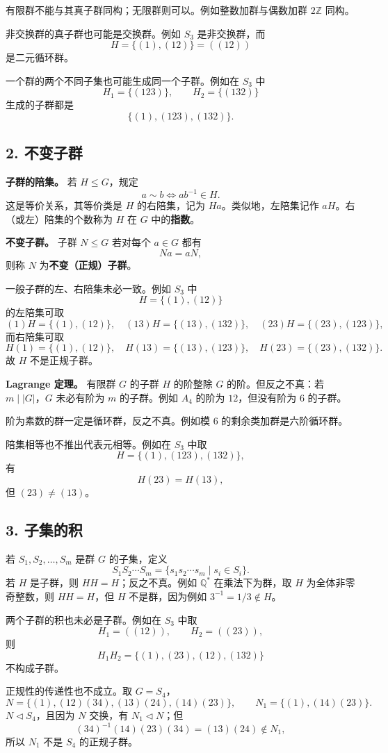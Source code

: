 有限群不能与其真子群同构；无限群则可以。例如整数加群与偶数加群 $2\mathbb Z$ 同构。

非交换群的真子群也可能是交换群。例如 $S_3$ 是非交换群，而
\[
H=\{(1),(12)\}=((12))
\]
是二元循环群。

一个群的两个不同子集也可能生成同一个子群。例如在 $S_3$ 中
\[
H_1=\{(123)\},\qquad H_2=\{(132)\}
\]
生成的子群都是
\[
\{(1),(123),(132)\}.
\]

\subsection*{2. 不变子群}

\textbf{子群的陪集。} 若 $H\le G$，规定
\[
a\sim b\Longleftrightarrow ab^{-1}\in H.
\]
这是等价关系，其等价类是 $H$ 的右陪集，记为 $Ha$。类似地，左陪集记作 $aH$。右（或左）陪集的个数称为 $H$ 在 $G$ 中的\textbf{指数}。

\textbf{不变子群。} 子群 $N\le G$ 若对每个 $a\in G$ 都有
\[
Na=aN,
\]
则称 $N$ 为\textbf{不变（正规）子群}。

一般子群的左、右陪集未必一致。例如 $S_3$ 中
\[
H=\{(1),(12)\}
\]
的左陪集可取
\[
(1)H=\{(1),(12)\},\quad
(13)H=\{(13),(132)\},\quad
(23)H=\{(23),(123)\},
\]
而右陪集可取
\[
H(1)=\{(1),(12)\},\quad
H(13)=\{(13),(123)\},\quad
H(23)=\{(23),(132)\}.
\]
故 $H$ 不是正规子群。

\textbf{Lagrange 定理。} 有限群 $G$ 的子群 $H$ 的阶整除 $G$ 的阶。但反之不真：若 $m\mid |G|$，$G$ 未必有阶为 $m$ 的子群。例如 $A_4$ 的阶为 $12$，但没有阶为 $6$ 的子群。

阶为素数的群一定是循环群，反之不真。例如模 $6$ 的剩余类加群是六阶循环群。

陪集相等也不推出代表元相等。例如在 $S_3$ 中取
\[
H=\{(1),(123),(132)\},
\]
有
\[
H(23)=H(13),
\]
但 $(23)\ne(13)$。

\subsection*{3. 子集的积}

若 $S_1,S_2,\ldots,S_m$ 是群 $G$ 的子集，定义
\[
S_1S_2\cdots S_m
=\{s_1s_2\cdots s_m\mid s_i\in S_i\}.
\]
若 $H$ 是子群，则 $HH=H$；反之不真。例如 $\mathbb Q^*$ 在乘法下为群，取 $H$ 为全体非零奇整数，则 $HH=H$，但 $H$ 不是群，因为例如 $3^{-1}=1/3\notin H$。

两个子群的积也未必是子群。例如在 $S_3$ 中取
\[
H_1=((12)),\qquad H_2=((23)),
\]
则
\[
H_1H_2=\{(1),(23),(12),(132)\}
\]
不构成子群。

正规性的传递性也不成立。取 $G=S_4$，
\[
N=\{(1),(12)(34),(13)(24),(14)(23)\},
\qquad
N_1=\{(1),(14)(23)\}.
\]
$N\triangleleft S_4$，且因为 $N$ 交换，有 $N_1\triangleleft N$；但
\[
(34)^{-1}(14)(23)(34)=(13)(24)\notin N_1,
\]
所以 $N_1$ 不是 $S_4$ 的正规子群。


